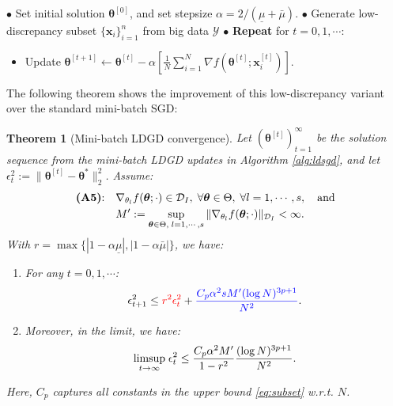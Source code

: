\documentclass[12pt]{article}
\newtheorem{theorem}{Theorem}
\newcommand{\bm}[1]{\mathbf{#1}}
\newcommand{\bi}{\begin{itemize}}
\newcommand{\ei}{\end{itemize}}
\newcommand{\crd}[1]{{\color{red}{#1}}}
\newcommand{\cbl}[1]{{\color{blue}{#1}}}
\begin{document}
\begin{algorithm}[t]
\caption{Mini-batch low-discrepancy gradient descent}
\label{alg:ldsgd}
\begin{algorithmic}
\STATE $\bullet$ Set initial solution $\boldsymbol{\theta}^{[0]}$, and set stepsize $\alpha = 2 / (\underline{\mu}+\bar{\mu})$.
\STATE $\bullet$ Generate low-discrepancy subset $\{\bm{x}_i\}_{i=1}^n$ from big data $\mathcal{Y}$
\STATE $\bullet$ \textbf{Repeat} for $t = 0, 1, \cdots$:
\bi
\item Update $\boldsymbol{\theta}^{[t+1]} \leftarrow \boldsymbol{\theta}^{[t]} - \alpha \left[ \frac{1}{N} \sum_{i=1}^N \nabla f(\boldsymbol{\theta}^{[t]}; \bm{x}_i^{[t]}) \right]$.
\ei
\end{algorithmic}
\end{algorithm}

The following theorem shows the improvement of this low-discrepancy variant over the standard mini-batch SGD:
\begin{theorem}[Mini-batch LDGD convergence]
Let $(\boldsymbol{\theta}^{[t]})_{t=1}^\infty$ be the solution sequence from the mini-batch LDGD updates in Algorithm \ref{alg:ldsgd}, and let $\epsilon^2_t := \|\boldsymbol{\theta}^{[t]} - \boldsymbol{\theta}^*\|_2^2$. Assume:
\begin{align}
\begin{split}
\textup{\textbf{(A5)}:} \quad &\nabla_{\theta_l} f(\boldsymbol{\theta}; \cdot) \in \mathcal{D}_I, \; \forall \boldsymbol{\theta} \in \Theta, \; \forall l = 1, \cdots, s, \quad \textup{and}\\
& M' := \sup_{\boldsymbol{\theta} \in \Theta, \; l = 1, \cdots, s} \| \nabla_{\theta_l} f(\boldsymbol{\theta}; \cdot) \|_{\mathcal{D}_I} < \infty.
\label{eq:ass2}
\end{split}
\end{align}
With $r = \max\{ |1-\alpha\underline{\mu}|, |1-\alpha \bar{\mu}| \}$, we have:
\begin{enumerate}[label=(\alph*)]
\item For any $t = 0, 1, \cdots$:
\begin{equation}
\epsilon^2_{t+1} \leq \crd{r^2 \epsilon^2_t} + \cbl{ \frac{C_p \alpha^2 s M' (\log N)^{3p+1}}{N^2} }.
\label{eq:ldsgd1}
\end{equation}
\item Moreover, in the limit, we have:
\begin{equation}
\underset{t \rightarrow \infty}{\textup{limsup}} \; \epsilon^2_t \leq \frac{C_p \alpha^2 M'}{1 - r^2} \frac{(\log N)^{3p+1}}{N^2} .
\label{eq:ldsgd2}
\end{equation}
\end{enumerate}
Here, $C_p$ captures all constants in the upper bound \eqref{eq:subset} w.r.t. $N$.
\label{thm:ldsgd}
\end{theorem}
\end{document}
